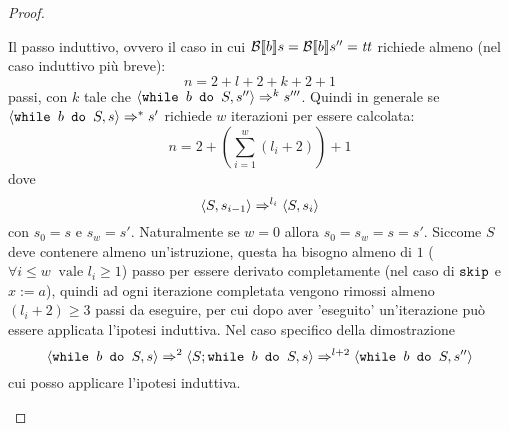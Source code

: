 {\begin{enumerate}
\begin{proof}
\begin{itemize}
\begin{itemize}
Il passo induttivo, ovvero il caso in cui $\mathcal{B} \llbracket b \rrbracket s = \mathcal{B} \llbracket b \rrbracket s'' = \mbox{\textit{tt}}$
richiede almeno (nel caso induttivo più breve):
$$
n = 2 + l + 2 + k + 2 + 1
$$
passi, 
con $k$ tale che $\langle{}\mbox{\normalfont{\texttt{while }}} b \textrm{\normalfont{\texttt{ do }}} S, s''\rangle{} \Rightarrow^{k} s'''$.
Quindi in generale se $\langle{}\mbox{\normalfont{\texttt{while }}} b \textrm{\normalfont{\texttt{ do }}} S, s\rangle{} \Rightarrow^{*} s'$ richiede $w$ iterazioni per essere calcolata:
$$
n = 2 + \left(\sum_{i=1}^{w} (l_i + 2)\right) + 1
$$
dove 
$$
\langle{}S, s_{i-1}\rangle{} \Rightarrow^{l_i} \langle{}S, s_i\rangle{}
$$
con $\boxed{s_0 = s}$ e $\boxed{s_w = s'}$. Naturalmente se $w = 0$
allora $s_0 = s_w = s = s'$.
Siccome $S$ deve contenere almeno un'istruzione, questa ha bisogno almeno di $1$ ($\forall i \leq w\ \text{ vale } l_i \geq 1$) passo per
essere derivato completamente (nel caso di $\textrm{\normalfont{\texttt{skip}}}$ e $x := a$), quindi 
ad ogni iterazione completata vengono rimossi almeno $(l_i + 2) \geq 3$ passi da eseguire, 
per cui dopo aver 'eseguito' un'iterazione può essere applicata l'ipotesi induttiva.
Nel caso specifico della dimostrazione
$$
\langle{}\mbox{\normalfont{\texttt{while }}} b \textrm{\normalfont{\texttt{ do }}} S, s\rangle{} \Rightarrow^{2} \langle{}S; \mbox{\normalfont{\texttt{while }}} b \textrm{\normalfont{\texttt{ do }}} S, s\rangle{} \Rightarrow^{l+2} \langle{}\mbox{\normalfont{\texttt{while }}} b \textrm{\normalfont{\texttt{ do }}} S, s''\rangle{}
$$
cui posso applicare l'ipotesi induttiva.
\end{itemize}
\end{itemize}
\end{proof}
\end{enumerate}
}
